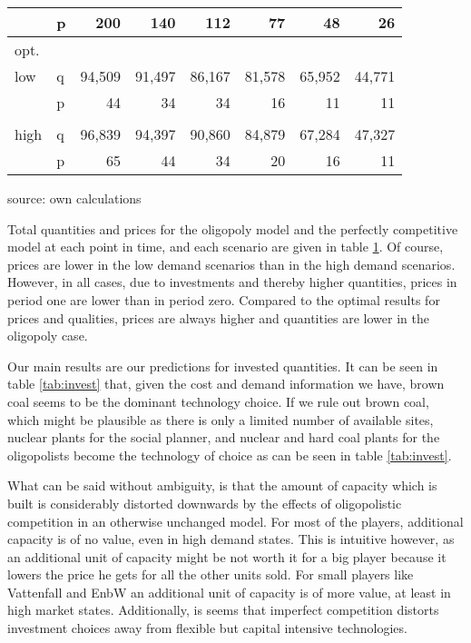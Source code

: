 \begin{table}
\begin{tabular}{llrrrrrr}
           &          p &        200 &        140 &        112 &         77 &         48 &         26 \\
\hline
   opt. &            &            &            &            &            &            &            \\
       low &          q &     94,509 &     91,497 &     86,167 &     81,578 &     65,952 &     44,771 \\
           &          p &         44 &         34 &         34 &         16 &         11 &         11 \\
           &            &            &            &            &            &            &            \\
      high &          q &     96,839 &     94,397 &     90,860 &     84,879 &     67,284 &     47,327 \\
           &          p &         65 &         44 &         34 &         20 &         16 &         11 \\
\hline
\hline
\end{tabular}  

\label{tab:dynquant}
\begin{center}
source: own calculations
\end{center}
\end{table}

Total quantities and prices for the oligopoly model and the perfectly competitive model at each point in time, and each scenario are given in table \ref{tab:dynquant}. Of course, prices are lower in the low demand scenarios than in the high demand scenarios. However, in all cases, due to investments and thereby higher quantities, prices in period one are lower than in period zero.
Compared to the optimal results for prices and qualities, prices are always higher and quantities are lower in the oligopoly case.

Our main results are our predictions for invested quantities. It can be seen in table \ref{tab:invest} that, given the cost and demand information we have, brown coal seems to be the dominant technology choice. If we rule out brown coal, which might be plausible as there is only a limited number of available sites, nuclear plants for the social planner, and nuclear and hard coal plants for the oligopolists become the technology of choice as can be seen in table \ref{tab:invest}.

What can be said without ambiguity, is that the amount of capacity which is built is considerably distorted downwards by the effects of oligopolistic competition in an otherwise unchanged model. For most of the players, additional capacity is of no value, even in high demand states. This is intuitive however, as an additional unit of capacity might be not worth it for a big player because it lowers the price he gets for all the other units sold. For small players like Vattenfall and EnbW an additional unit of capacity is of more value, at least in high market states. Additionally, is seems that imperfect competition distorts investment choices away from flexible but capital intensive technologies.

